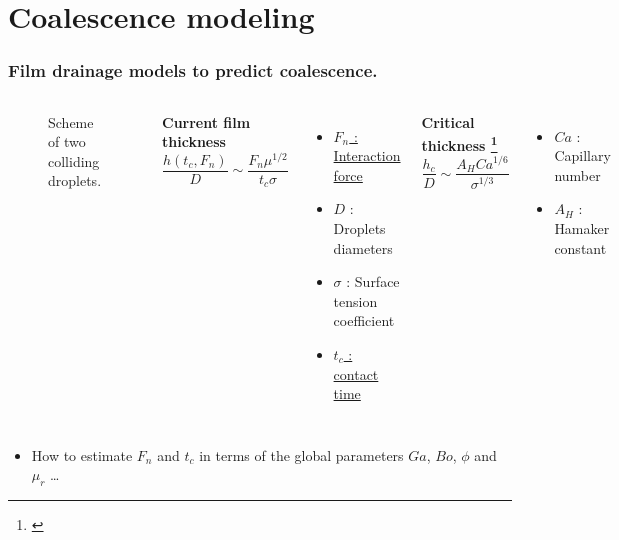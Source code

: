 \documentclass{sintefbeamer}
\begin{document}
\section{Coalescence modeling}

\begin{frame}
  \frametitle{Film drainage models to predict coalescence.}
  \begin{columns}
    \centering
    \begin{figure} 
      \caption{Scheme of two colliding droplets.}
    \end{figure}
    \begin{columns}[t]
      \textbf{Current film thickness}  
      \begin{equation*}
        \frac{h(t_c,F_n)}{D}  \sim \frac{F_n \mu^{1/2}}{t_c \sigma} 
      \end{equation*}
      \begin{itemize}
        \item \underline{$F_n$ : Interaction force}
        \item $D$ : Droplets diameters
        \item $\sigma$ : Surface tension coefficient
        \item \underline{$t_c$ : contact time}
      \end{itemize}
      \textbf{Critical thickness \footnote{\citet{yoon2007coalescence}}} 
      \begin{equation*}
        \frac{h_c}{D} \sim  \frac{A_HCa^{1/6}}{\sigma^{1/3}} 
      \end{equation*}
      \begin{itemize}
        \item $Ca$ : Capillary number 
        \item $A_H$ : Hamaker constant
      \end{itemize}
    \end{columns}
  \end{columns}
  \begin{itemize}
    \item How to estimate $F_n$ and $t_c$ in terms of the global parameters $Ga$, $Bo$, $\phi$ and $\mu_r$ \ldots
  \end{itemize}
\end{frame}
\end{document}
